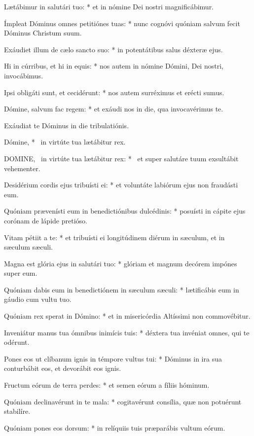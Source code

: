 Lætábimur in salutári tuo: * et in nómine Dei nostri magnificábimur.

Ímpleat Dóminus omnes petitiónes tuas: * nunc cognóvi quóniam salvum fecit Dóminus Christum suum.

Exáudiet illum de cælo sancto suo: * in potentátibus salus déxteræ ejus.

Hi in cúrribus, et hi in equis: * nos autem in nómine Dómini, Dei nostri, invocábimus.

Ipsi obligáti sunt, et cecidérunt: * nos autem surréximus et erécti sumus.

Dómine, salvum fac regem: * et exáudi nos in die, qua invocavérimus te.

 Exáudiat te Dóminus in die tribulatiónis.

 Dómine, * \textdagger\ in virtúte tua lætábitur rex. \textdaggerdbl


\lettrine[lines=2]{D}{OMINE}, \textdagger\ in virtúte tua lætábitur rex: * \textdaggerdbl\ et super salutáre tuum exsultábit vehementer.

Desidérium cordis ejus tribuísti ei: * et voluntáte labiórum ejus non fraudásti eum.

Quóniam prævenísti eum in benedictiónibus dulcédinis: * posuísti in cápite ejus corónam de lápide pretióso.

Vitam pétiit a te: * et tribuísti ei longitúdinem diérum in sæculum, et in sæculum sæculi.

Magna est glória ejus in salutári tuo: * glóriam et magnum decórem impónes super eum.

Quóniam dabis eum in benedictiónem in sæculum sæculi: * lætificábis eum in gáudio cum vultu tuo.

Quóniam rex sperat in Dómino: * et in misericórdia Altíssimi non commovébitur.

Inveniátur manus tua ómnibus inimícis tuis: * déxtera tua invéniat omnes, qui te odérunt.

Pones eos ut clíbanum ignis in témpore vultus tui: * Dóminus in ira sua conturbábit eos, et devorábit eos ignis.

Fructum eórum de terra perdes: * et semen eórum a fíliis hóminum.

Quóniam declinavérunt in te mala: * cogitavérunt consília, quæ non potuérunt stabilíre.

Quóniam pones eos dorsum: * in relíquiis tuis præparábis vultum eórum.

